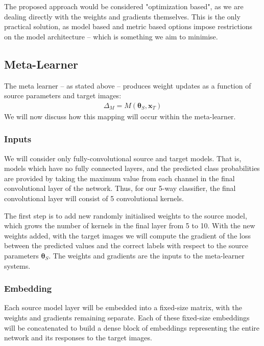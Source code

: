 \documentclass{report}
\begin{document}
	The proposed approach would be considered "optimization based", as we are dealing directly with the weights and gradients themselves. This is the only practical solution, as model based and metric based options impose restrictions on the model architecture -- which is something we aim to minimise. \par
	
	\subsection{Meta-Learner}
	The meta learner -- as stated above -- produces weight updates as a function of source parameters and target images:
	\begin{align}
	\Delta_M = M(\bm{\theta}_S, \bm{x}_T)
	\end{align}
	We will now discuss how this mapping will occur within the meta-learner.
	
	\subsubsection{Inputs}
	We will consider only fully-convolutional source and target models. That is, models which have no fully connected layers, and the predicted class probabilities are provided by taking the maximum value from each channel in the final convolutional layer of the network. Thus, for our 5-way classifier, the final convolutional layer will consist of 5 convolutional kernels. \par
	The first step is to add new randomly initialised weights to the source model, which grows the number of kernels in the final layer from 5 to 10. With the new weights added, with the target images we will compute the gradient of the loss between the predicted values and the correct labels with respect to the source parameters $\bm{\theta}_S$. The weights and gradients are the inputs to the meta-learner systems. \par
	
	\subsubsection{Embedding}
	Each source model layer will be embedded into a fixed-size matrix, with the weights and gradients remaining separate. Each of these fixed-size embeddings will be concatenated to build a dense block of embeddings representing the entire network and its responses to the target images. \par
	
\end{document}
